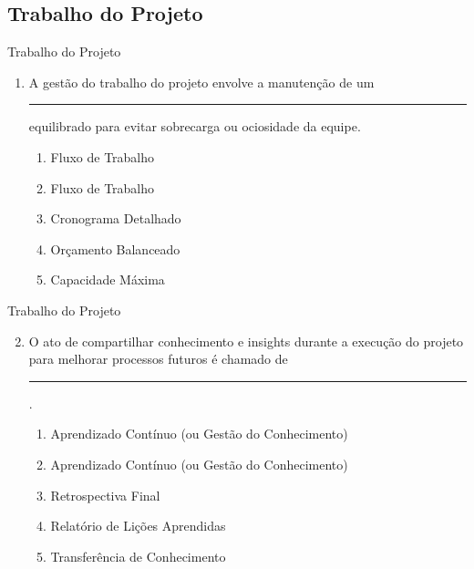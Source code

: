 \documentclass{beamer}
\begin{document}
\subsection{Trabalho do Projeto}

\begin{frame}{Trabalho do Projeto}
	\begin{enumerate}
		\justifying
		\item A gestão do trabalho do projeto envolve a manutenção de um \rule{70pt}{1pt} equilibrado para evitar sobrecarga ou ociosidade da equipe.
		\begin{enumerate}[a]
			\item Fluxo de Trabalho
			\item \alert<2>{Fluxo de Trabalho}
			\item Cronograma Detalhado
			\item Orçamento Balanceado
			\item Capacidade Máxima
		\end{enumerate}
	\end{enumerate}
\end{frame}

\begin{frame}{Trabalho do Projeto}
	\begin{enumerate}
		\setcounter{enumi}{1}
		\justifying
		\item O ato de compartilhar conhecimento e insights durante a execução do projeto para melhorar processos futuros é chamado de \rule{80pt}{1pt}.
		\begin{enumerate}[a]
			\item Aprendizado Contínuo (ou Gestão do Conhecimento)
			\item \alert<2>{Aprendizado Contínuo (ou Gestão do Conhecimento)}
			\item Retrospectiva Final
			\item Relatório de Lições Aprendidas
			\item Transferência de Conhecimento
		\end{enumerate}
	\end{enumerate}
\end{frame}
\end{document}
